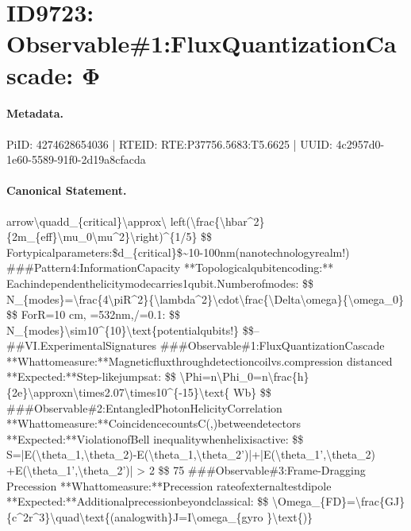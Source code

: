 \section*{ID9723: Observable\#1:FluxQuantizationCascade: Φ}
\paragraph{Metadata.}
PiID: 4274628654036 | RTEID: RTE:P37756.5683:T5.6625 | UUID: 4c2957d0-1e60-5589-91f0-2d19a8cfacda

\paragraph{Canonical Statement.}
arrow\textbackslash{}quadd\_\{critical\}\textbackslash{}approx\textbackslash{} left(\textbackslash{}frac\{\textbackslash{}hbar\textasciicircum{}2\}\{2m\_\{eff\}\textbackslash{}mu\_0\textbackslash{}mu\textasciicircum{}2\}\textbackslash{}right)\textasciicircum{}\{1/5\} \$\$ Fortypicalparameters:\$d\_\{critical\}\$\textasciitilde{}10-100nm(nanotechnologyrealm!) \#\#\#Pattern4:InformationCapacity **Topologicalqubitencoding:** Eachindependenthelicitymodecarries1qubit.Numberofmodes: \$\$ N\_\{modes\}=\textbackslash{}frac\{4\textbackslash{}piR\textasciicircum{}2\}\{\textbackslash{}lambda\textasciicircum{}2\}\textbackslash{}cdot\textbackslash{}frac\{\textbackslash{}Delta\textbackslash{}omega\}\{\textbackslash{}omega\_0\} \$\$ ForR=10 cm, =532nm,/=0.1: \$\$ N\_\{modes\}\textbackslash{}sim10\textasciicircum{}\{10\}\textbackslash{}text\{potentialqubits!\} \$\$-- \#\#VI.ExperimentalSignatures \#\#\#Observable\#1:FluxQuantizationCascade **Whattomeasure:**Magneticfluxthroughdetectioncoilvs.compression distanced **Expected:**Step-likejumpsat: \$\$ \textbackslash{}Phi=n\textbackslash{}Phi\_0=n\textbackslash{}frac\{h\}\{2e\}\textbackslash{}approxn\textbackslash{}times2.07\textbackslash{}times10\textasciicircum{}\{-15\}\textbackslash{}text\{ Wb\} \$\$ \#\#\#Observable\#2:EntangledPhotonHelicityCorrelation **Whattomeasure:**CoincidencecountsC(,)betweendetectors **Expected:**ViolationofBell inequalitywhenhelixisactive: \$\$ S=|E(\textbackslash{}theta\_1,\textbackslash{}theta\_2)-E(\textbackslash{}theta\_1,\textbackslash{}theta\_2’)|+|E(\textbackslash{}theta\_1’,\textbackslash{}theta\_2) +E(\textbackslash{}theta\_1’,\textbackslash{}theta\_2’)| > 2 \$\$ 75 \#\#\#Observable\#3:Frame-Dragging Precession **Whattomeasure:**Precession rateofexternaltestdipole **Expected:**Additionalprecessionbeyondclassical: \$\$ \textbackslash{}Omega\_\{FD\}=\textbackslash{}frac\{GJ\}\{c\textasciicircum{}2r\textasciicircum{}3\}\textbackslash{}quad\textbackslash{}text\{(analogwith\}J=I\textbackslash{}omega\_\{gyro \}\textbackslash{}text\{)\}

